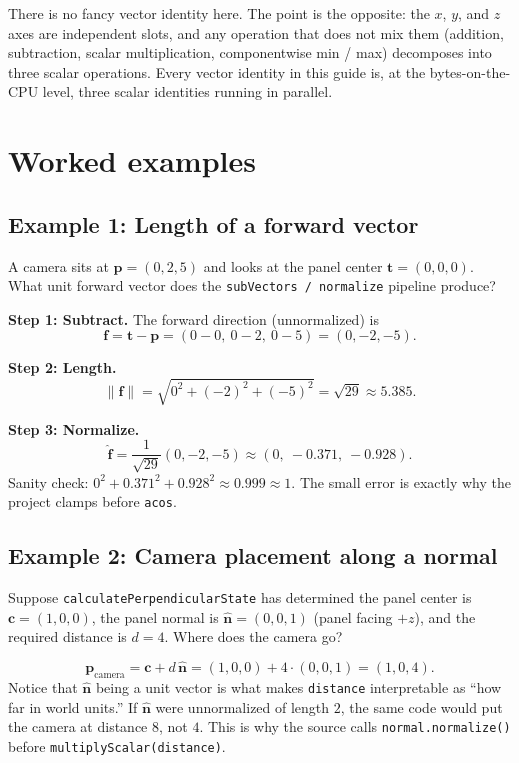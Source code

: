 \documentclass{article}
\begin{document}
There is no fancy vector identity here. The point is the opposite: the $x$,
$y$, and $z$ axes are independent slots, and any operation that does not
mix them (addition, subtraction, scalar multiplication, componentwise min /
max) decomposes into three scalar operations. Every vector identity in this
guide is, at the bytes-on-the-CPU level, three scalar identities running in
parallel.

\section{Worked examples}

\subsection*{Example 1: Length of a forward vector}

A camera sits at $\mathbf{p} = (0, 2, 5)$ and looks at the panel center
$\mathbf{t} = (0, 0, 0)$. What unit forward vector does the
\texttt{subVectors / normalize} pipeline produce?

\textbf{Step 1: Subtract.} The forward direction (unnormalized) is
\[
\mathbf{f} = \mathbf{t} - \mathbf{p} = (0-0,\ 0-2,\ 0-5) = (0, -2, -5).
\]

\textbf{Step 2: Length.}
\[
\|\mathbf{f}\| = \sqrt{0^2 + (-2)^2 + (-5)^2} = \sqrt{29} \approx 5.385.
\]

\textbf{Step 3: Normalize.}
\[
\hat{\mathbf{f}} = \frac{1}{\sqrt{29}}(0, -2, -5)
   \approx (0,\ -0.371,\ -0.928).
\]
Sanity check: $0^2 + 0.371^2 + 0.928^2 \approx 0.999 \approx 1$. The small
error is exactly why the project clamps before \texttt{acos}.

\subsection*{Example 2: Camera placement along a normal}

Suppose \texttt{calculatePerpendicularState} has determined the panel center
is $\mathbf{c} = (1, 0, 0)$, the panel normal is $\hat{\mathbf{n}} = (0, 0, 1)$
(panel facing $+z$), and the required distance is $d = 4$. Where does the
camera go?

\[
\mathbf{p}_{\text{camera}} = \mathbf{c} + d\,\hat{\mathbf{n}}
   = (1, 0, 0) + 4\cdot(0, 0, 1) = (1, 0, 4).
\]
Notice that $\hat{\mathbf{n}}$ being a unit vector is what makes
\texttt{distance} interpretable as ``how far in world units.'' If
$\hat{\mathbf{n}}$ were unnormalized of length $2$, the same code would put
the camera at distance $8$, not $4$. This is why the source calls
\texttt{normal.normalize()} before \texttt{multiplyScalar(distance)}.
\end{document}
